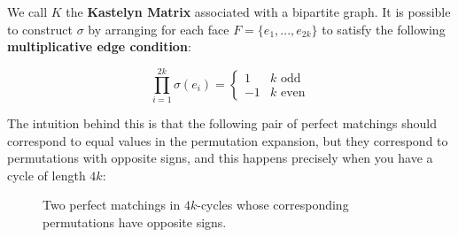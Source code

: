 \documentclass{article}
\begin{document}
		We call $K$ the \textbf{Kastelyn Matrix} associated with a bipartite graph. It is possible to construct $\sigma$ by arranging for each face $F = \{ e_1, ..., e_{2k} \}$ to satisfy the following \textbf{multiplicative edge condition}: 
		
		$$ \prod_{i=1}^{2k} \sigma(e_i) = \begin{cases}
		1 & \text{$k$ odd}\\
		-1 & \text{$k$ even}
		\end{cases} $$
		
		The intuition behind this is that the following pair of perfect matchings should correspond to equal values in the permutation expansion, but they correspond to permutations with opposite signs, and this happens precisely when you have a cycle of length $4k$:
		
\begin{figure}[H]
	\begin{minipage}{.45\textwidth}
		\begin{center}
		\end{center}
		
	\end{minipage}\begin{minipage}{.45\textwidth}
		\begin{center}
		\end{center}
	\end{minipage}
\caption{Two perfect matchings in $4k$-cycles whose corresponding permutations have opposite signs.}
\end{figure}
		
\end{document}
